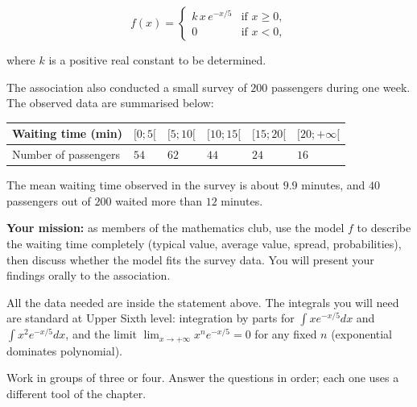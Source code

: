 \documentclass[11pt]{article}
\newcounter{popsec}
\newcounter{popsub}
\newcommand{\courssub}[1]{%
  \stepcounter{popsub}%
  \par\vspace{9pt}\noindent{\popxbold\fontsize{11.5}{13}\selectfont\color{popink}{\color{poporange}\thepopsec.\thepopsub}\hspace{6pt}#1}\par\nopagebreak\vspace{4pt}
}
\begin{document}
\[
f(x) = \begin{cases} k\,x\,e^{-x/5} & \text{if } x \geq 0,\\[2pt] 0 & \text{if } x < 0, \end{cases}
\]

where $k$ is a positive real constant to be determined.

The association also conducted a small survey of $200$ passengers during one week. The observed data are summarised below:

\begin{center}
\begin{tabularx}{\linewidth}{|l|X|X|X|X|X|}
\hline
\rowcolor{popblueL} Waiting time (min) & $[0;5[$ & $[5;10[$ & $[10;15[$ & $[15;20[$ & $[20;+\infty[$ \\
\hline Number of passengers & $54$ & $62$ & $44$ & $24$ & $16$ \\
\hline
\end{tabularx}
\end{center}

The mean waiting time observed in the survey is about $9.9$ minutes, and $40$ passengers out of $200$ waited more than $12$ minutes.

\textbf{Your mission:} as members of the mathematics club, use the model $f$ to describe the waiting time completely (typical value, average value, spread, probabilities), then discuss whether the model fits the survey data. You will present your findings orally to the association.

\begin{attention}
All the data needed are inside the statement above. The integrals you will need are standard at Upper Sixth level: integration by parts for $\int x e^{-x/5}dx$ and $\int x^2 e^{-x/5}dx$, and the limit $\lim_{x\to+\infty} x^n e^{-x/5} = 0$ for any fixed $n$ (exponential dominates polynomial).
\end{attention}

\courssub{Tasks}

Work in groups of three or four. Answer the questions in order; each one uses a different tool of the chapter.
\end{document}
